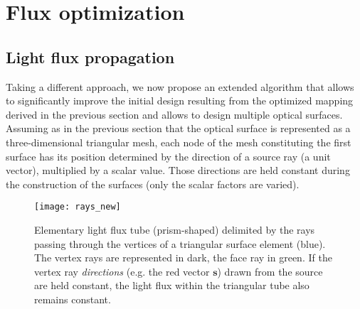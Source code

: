 
\section{Flux optimization}
\subsection{Light flux propagation}

Taking a different approach, we now propose an extended algorithm that
allows to significantly improve the initial design resulting from the
optimized mapping derived in the previous section and allows to design
multiple optical surfaces.  Assuming as in the previous section that
the optical surface is represented as a three-dimensional triangular
mesh, each node of the mesh constituting the first surface has its
position determined by the direction of a source ray (a unit vector),
multiplied by a scalar value. Those directions are held constant
during the construction of the surfaces (only the scalar factors are
varied).

\begin{figure}[!htbp]
  \centering \texttt{[image: rays\_new]}
  \caption{Elementary light flux tube (prism-shaped) delimited by the rays passing
    through the vertices of a triangular surface element (blue). The
    vertex rays are represented in dark, the face ray in green.  If
    the vertex ray \textit{directions} (e.g. the red vector
    $\mathbf{s}$) drawn from the source are held constant, the light
    flux within the triangular tube also remains constant.}
  \label{fig:rays}
\end{figure}


